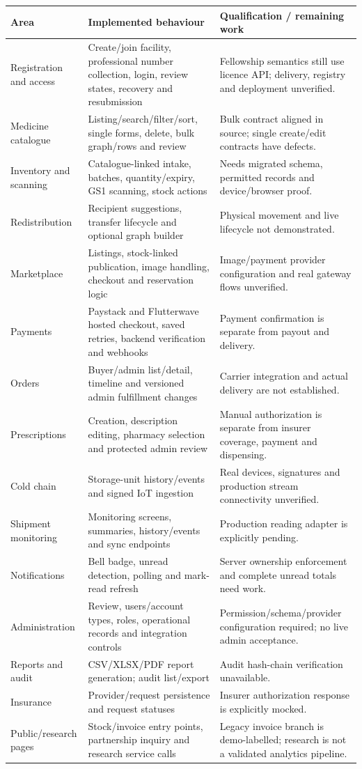 \documentclass[11pt,a4paper]{article}
\begin{document}
\begin{longtable}{L{0.22\textwidth}L{0.35\textwidth}L{0.34\textwidth}}
\toprule
\textbf{Area} & \textbf{Implemented behaviour} & \textbf{Qualification / remaining work}\\
\midrule\endhead
Registration and access & Create/join facility, professional number collection, login, review states, recovery and resubmission & Fellowship semantics still use licence API; delivery, registry and deployment unverified.\\
Medicine catalogue & Listing/search/filter/sort, single forms, delete, bulk graph/rows and review & Bulk contract aligned in source; single create/edit contracts have defects.\\
Inventory and scanning & Catalogue-linked intake, batches, quantity/expiry, GS1 scanning, stock actions & Needs migrated schema, permitted records and device/browser proof.\\
Redistribution & Recipient suggestions, transfer lifecycle and optional graph builder & Physical movement and live lifecycle not demonstrated.\\
Marketplace & Listings, stock-linked publication, image handling, checkout and reservation logic & Image/payment provider configuration and real gateway flows unverified.\\
Payments & Paystack and Flutterwave hosted checkout, saved retries, backend verification and webhooks & Payment confirmation is separate from payout and delivery.\\
Orders & Buyer/admin list/detail, timeline and versioned admin fulfillment changes & Carrier integration and actual delivery are not established.\\
Prescriptions & Creation, description editing, pharmacy selection and protected admin review & Manual authorization is separate from insurer coverage, payment and dispensing.\\
Cold chain & Storage-unit history/events and signed IoT ingestion & Real devices, signatures and production stream connectivity unverified.\\
Shipment monitoring & Monitoring screens, summaries, history/events and sync endpoints & Production reading adapter is explicitly pending.\\
Notifications & Bell badge, unread detection, polling and mark-read refresh & Server ownership enforcement and complete unread totals need work.\\
Administration & Review, users/account types, roles, operational records and integration controls & Permission/schema/provider configuration required; no live admin acceptance.\\
Reports and audit & CSV/XLSX/PDF report generation; audit list/export & Audit hash-chain verification unavailable.\\
Insurance & Provider/request persistence and request statuses & Insurer authorization response is explicitly mocked.\\
Public/research pages & Stock/invoice entry points, partnership inquiry and research service calls & Legacy invoice branch is demo-labelled; research is not a validated analytics pipeline.\\
\bottomrule
\end{longtable}
\end{document}
